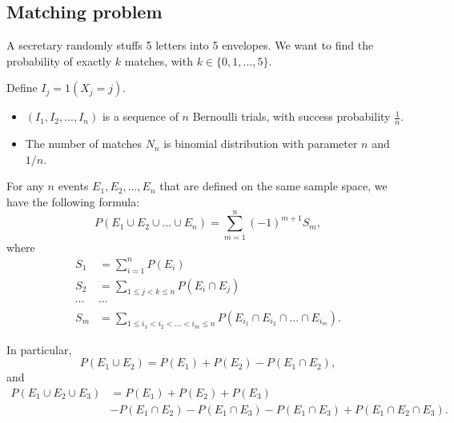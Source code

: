 \begin{refsection}
\subsection{Matching problem}


\begin{example}
A secretary randomly stuffs 5 letters into 5 envelopes. We want to find the probability of exactly $k$ matches, with $k\in \{0,1,...,5\}$.	
\end{example}



\begin{lemma}
Define $I_j = 1(X_j=j)$. 
\begin{itemize}
	\item $(I_1,I_2,...,I_n)$ is a sequence of $n$ Bernoulli trials, with success probability $\frac{1}{n}$.
	\item The number of matches $N_n$ is binomial distribution with parameter $n$ and $1/n$.
\end{itemize}
\end{lemma}


\begin{lemma}\label{ch:theory-of-probability:th:ProbabilityOfUnionOfEvents}
For any $n$ events $E_1,E_2,...,E_n$ that are defined on the same sample	space, we have the following formula:
$$P(E_1\cup E_2\cup ... \cup E_n) = \sum_{m=1}^n (-1)^{m+1}S_m,$$
where
\begin{align*}
S_1 &= \sum_{i=1}^n P(E_i) \\
S_2 &= \sum_{1\leq j < k \leq n} P(E_i\cap E_j) \\
\cdots & \cdots \\
S_m &= \sum_{1\leq i_1<i_2 < ... <i_m \leq n} P(E_{i_1}\cap E_{i_2}\cap ... \cap E_{i_m}). 
\end{align*}

In particular, 
$$P(E_1\cup E_2) = P(E_1) +　 P(E_2) - P(E_1\cap E_2),$$
and
\begin{align*}
P(E_1\cup E_2 \cup E_3) &= P(E_1) + P(E_2) + P(E_3) \\
& -P(E_1\cap E_2) - P(E_1\cap E_3) - P(E_1\cap E_3) + P(E_1\cap E_2 \cap E_3).
\end{align*}
\end{lemma}



\end{refsection}
